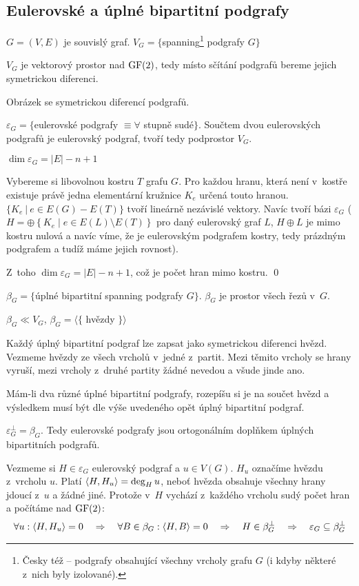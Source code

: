 \subsection{Eulerovské a úplné bipartitní podgrafy}


$G = (V,E)$ je souvislý graf. $V_G = \{$spanning\footnote{Česky též  --
podgrafy obsahující všechny vrcholy grafu $G$ (i kdyby některé z~nich byly
izolované).} podgrafy $G\}$

\tv $V_G$ je vektorový prostor nad $\mathrm{GF}(2)$, tedy místo sčítání podgrafů bereme jejich
symetrickou diferenci.

\bigskip
\todo Obrázek se symetrickou diferencí podgrafů.
\bigskip

\df $\varepsilon_G = \{$eulerovské podgrafy $\equiv \forall $ stupně sudé$\}$. Součtem
dvou eulerovských podgrafů je eulerovský podgraf, tvoří tedy podprostor $V_G$.

\lm $\dim \varepsilon_G = |E| - n + 1$

\dk Vybereme si libovolnou kostru $T$ grafu $G$. Pro každou hranu, která není v~kostře
existuje právě jedna elementární kružnice $K_e$ určená touto hranou. $\{ K_e\ |\ e \in
E(G) - E(T) \}$ tvoří lineárně nezávislé vektory. Navíc tvoří bázi $\varepsilon_G$ ($H
= \oplus \left\{ K_e \mid e \in E(L) \setminus E(T) \right\}$ pro daný eulerovský graf
$L$, $H \oplus L$ je mimo kostru nulová a navíc víme, že je eulerovským podgrafem
kostry, tedy prázdným podgrafem a tudíž máme jejich rovnost).

Z~toho $\dim \varepsilon_G = |E| - n + 1$, což je počet hran mimo kostru. \qed

\df $\beta_G = \{$úplné bipartitní spanning podgrafy $G\}$. $\beta_G$ je
prostor všech řezů v~$G$.

\lm $\beta_G \ll V_G$, $\beta_G = \langle\{$ hvězdy $\}\rangle$

\dk Každý úplný bipartitní podgraf lze zapsat jako symetrickou diferenci hvězd.
Vezmeme hvězdy ze všech vrcholů v~jedné z~partit. Mezi těmito vrcholy se hrany
vyruší, mezi vrcholy z~druhé partity žádné nevedou a všude jinde ano. 

Mám-li dva různé úplné bipartitní podgrafy, rozepíšu si je na součet hvězd a
výsledkem musí být dle výše uvedeného opět úplný bipartitní podgraf.

\vt $\varepsilon_G^\bot = \beta_G$. Tedy eulerovské podgrafy jsou ortogonálním
doplňkem úplných bipartitních podgrafů.

\dk Vezmeme si $H \in \varepsilon_G$ eulerovský podgraf a $u \in V(G)$. $H_u$
označíme hvězdu z~vrcholu $u$. Platí ${\langle H,H_u\rangle} = \deg_H u$, neboť hvězda
obsahuje všechny hrany jdoucí z~$u$ a žádné jiné. Protože v~$H$ vychází
z~každého vrcholu sudý počet hran a počítáme nad $\mathrm{GF}(2)$:
\begin{align*}
\forall u: {\langle H,H_u\rangle} = 0 \quad\Rightarrow\quad \forall B\in \beta_G: {\langle H,B\rangle} = 0 \quad\Rightarrow\quad H \in \beta_G^\bot \quad\Rightarrow\quad \varepsilon_G \subseteq \beta_G^\bot
\end{align*}

